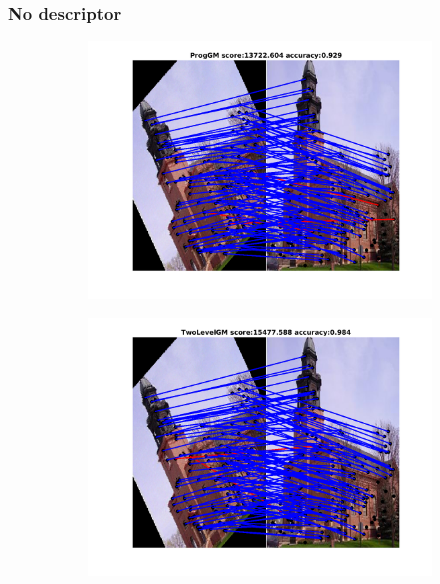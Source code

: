 \documentclass[
	fontsize=12pt,
	paper=a4,
	twoside=false,
	numbers=noenddot,
	plainheadsepline,
	toc=listof,
	toc=bibliography
]{scrartcl}
\begin{document}
\subsubsection{No descriptor}
\begin{figure}[h] 
	
	\begin{subfigure}[b]{0.33\textwidth}
		\centering
		\includegraphics[scale=0.25]{"fig_ver2608/RealImages/ImgTrafo/no_descr/using_cpd_afftrafo/fi_1_ProgGM"} 
	\end{subfigure}%
	\begin{subfigure}[b]{0.33\textwidth}
		\centering
		\includegraphics[scale=0.25]{"fig_ver2608/RealImages/ImgTrafo/no_descr/using_cpd_afftrafo/fi_1_TwoLevelGM"} 

\end{subfigure}
\end{figure}
\end{document}

